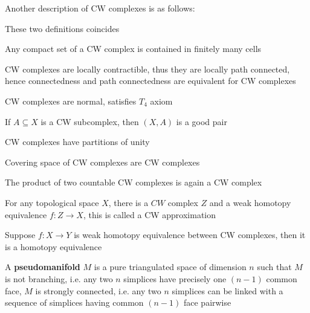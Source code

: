 \documentclass[main]{subfiles}
\begin{document}
\begin{theorem}
Another description of CW complexes is as follows: \par
These two definitions coincides
\end{theorem}

\begin{proposition}
Any compact set of a CW complex is contained in finitely many cells
\end{proposition}

\begin{proposition}
CW complexes are locally contractible, thus they are locally path connected, hence connectedness and path connectedness are equivalent for CW complexes
\end{proposition}

\begin{theorem}
CW complexes are normal, satisfies $T_4$ axiom
\end{theorem}

\begin{proposition}
If $A\subseteq X$ is a CW subcomplex, then $(X,A)$ is a good pair
\end{proposition}

\begin{theorem}
CW complexes have partitions of unity
\end{theorem}

\begin{proposition}
Covering space of CW complexes are CW complexes
\end{proposition}

\begin{proposition}
The product of two countable CW complexes is again a CW complex
\end{proposition}

\begin{theorem}[CW approximation]\label{CW approximation}
For any topological space $X$, there is a $CW$ complex $Z$ and a weak homotopy equivalence $f:Z\to X$, this is called a CW approximation
\end{theorem}

\begin{theorem}\label{Whitehead's theorem}
Suppose $f:X\to Y$ is weak homotopy equivalence between CW complexes, then it is a homotopy equivalence
\end{theorem}

\begin{definition}
A \textbf{pseudomanifold} $M$ is a pure triangulated space of dimension $n$ such that $M$ is not branching, i.e. any two $n$ simplices have precisely one $(n-1)$ common face, $M$ is strongly connected, i.e. any two $n$ simplices can be linked with a sequence of simplices having common $(n-1)$ face pairwise
\end{definition}
\end{document}
